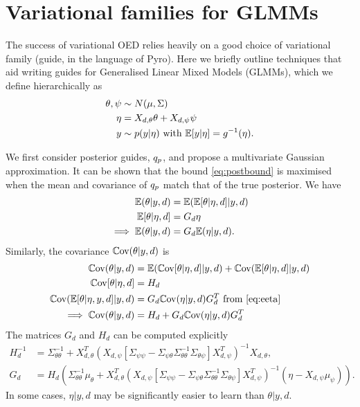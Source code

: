 \section{Variational families for GLMMs}
\label{sec:glmms}
The success of variational OED relies heavily on a good choice of variational family (guide, in the language of Pyro). Here we briefly outline techniques that aid writing guides for Generalised Linear Mixed Models (GLMMs), which we define hierarchically as
\begin{align}
	\theta, \psi &\sim N(\mu, \Sigma) \\
	\eta &= X_{d, \theta} \theta + X_{d, \psi} \psi \\
	y &\sim p(y|\eta) \text{ with } \mathbb{E}[y|\eta] = g^{-1}(\eta).
\end{align}

We first consider posterior guides, $q_p$, and propose a multivariate Gaussian approximation. It can be shown that the bound \eqref{eq:postbound} is maximised when the mean and covariance of $q_p$ match that of the true posterior. We have
\begin{align}
	\mathbb{E}(\theta|y, d) &= \mathbb{E}(\mathbb{E}[\theta|\eta, d]|y, d) \\
	\label{eq:eeta}
	\mathbb{E}[\theta|\eta, d] &= G_d \eta \\
	\implies \mathbb{E}(\theta|y, d) &= G_d \mathbb{E}(\eta|y, d).
\end{align}
Similarly, the covariance $\mathbb{C}\text{ov}(\theta|y,d)$ is
\begin{align}
	\mathbb{C}\text{ov}(\theta | y, d) &= \mathbb{E}(\mathbb{C}\text{ov}[\theta | \eta, d] | y,d) + \mathbb{C}\text{ov}( \mathbb{E}[\theta | \eta, d] | y, d) \\
	\mathbb{C}\text{ov}[\theta | \eta, d] &= H_d \\
	\mathbb{C}\text{ov}( \mathbb{E}[\theta | \eta, y, d] | y, d) &= 
	G_d \mathbb{C}\text{ov}(\eta|y, d) G_d^T \text{ from \eqref{eq:eeta}} \\
	\implies \mathbb{C}\text{ov}(\theta | y, d) &= H_d + G_d \mathbb{C}\text{ov}(\eta|y, d) G_d^T
\end{align}
The matrices $G_d$ and $H_d$ can be computed explicitly
\begin{align}
	H_d^{-1} &= \Sigma_{\theta\theta}^{-1} + X_{d, \theta}^T(X_{d, \psi}[\Sigma_{\psi\psi} - \Sigma_{\psi\theta}\Sigma_{\theta\theta}^{-1}\Sigma_{\theta\psi}]X_{d, \psi}^T)^{-1}X_{d, \theta}, \\
	G_d &= H_d(\Sigma_{\theta\theta}^{-1}\mu_\theta + X_{d, \theta}^T(X_{d, \psi}[\Sigma_{\psi\psi} - \Sigma_{\psi\theta}\Sigma_{\theta\theta}^{-1}\Sigma_{\theta\psi}]X_{d, \psi}^T)^{-1}(\eta - X_{d, \psi}\mu_\psi)).
\end{align}
In some cases, $\eta | y, d$ may be significantly easier to learn than $\theta | y, d$.

